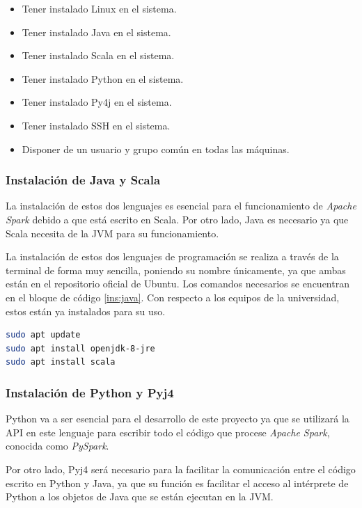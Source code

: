 \begin{itemize}
\item Tener instalado Linux en el sistema.
\item Tener instalado Java en el sistema.
\item Tener instalado Scala \cite{scala} en el sistema.
\item Tener instalado Python en el sistema.
\item Tener instalado Py4j \cite{py4j} en el sistema.
\item Tener instalado SSH en el sistema.
\item Disponer de un usuario y grupo común en todas las máquinas.
\end{itemize}

\subsubsection{Instalación de Java y Scala}
La instalación de estos dos lenguajes es esencial para el funcionamiento de \textit{Apache Spark} debido a que está escrito en Scala. Por otro lado, Java es necesario ya que Scala \cite{scala} necesita de la \gls{JVM} para su funcionamiento.

La instalación de estos dos lenguajes de programación se realiza a través de la terminal de forma muy sencilla, poniendo su nombre únicamente, ya que ambas están en el repositorio oficial de Ubuntu. Los comandos necesarios se encuentran en el bloque de código \ref{ins:java}. Con respecto a los equipos de la universidad, estos están ya instalados para su uso.

\begin{lstlisting}[label=ins:java,language=sh,frame=single,caption=Instalación de Java y Scala]
sudo apt update
sudo apt install openjdk-8-jre
sudo apt install scala
\end{lstlisting}

\subsubsection{Instalación de Python y Pyj4}
Python va a ser esencial para el desarrollo de este proyecto ya que se utilizará la \gls{API} en este lenguaje para escribir todo el código que procese \textit{Apache Spark}, conocida como \textit{PySpark}. 

Por otro lado, Pyj4 \cite{py4j} será necesario para la facilitar la comunicación entre el código escrito en Python y Java, ya que su función es facilitar el acceso al intérprete de Python a los objetos de Java que se están ejecutan en la \gls{JVM}.

